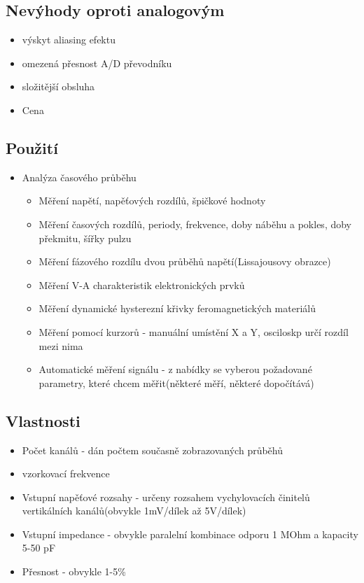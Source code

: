 \subsection*{Nevýhody oproti analogovým}
\begin{itemize}
    \item výskyt aliasing efektu
    \item omezená přesnost A/D převodníku
    \item složitější obsluha
    \item Cena 
\end{itemize}

\subsection*{Použití}
\begin{itemize}
    \item Analýza časového průběhu
    \begin{itemize}
        \item Měření napětí, napěťových rozdílů, špičkové hodnoty
        \item Měření časových rozdílů, periody, frekvence, doby náběhu a pokles, doby překmitu, šířky pulzu
        \item Měření fázového rozdílu dvou průběhů napětí(Lissajousovy obrazce)
        \item Měření V-A charakteristik elektronických prvků
        \item Měření dynamické hysterezní křivky feromagnetických materiálů
        \item Měření pomocí kurzorů - manuální umístění X a Y, osciloskp určí rozdíl mezi nima
        \item Automatické měření signálu - z nabídky se vyberou požadované parametry, které chcem měřit(některé měří, některé dopočítává)
    \end{itemize}
\end{itemize}

\subsection*{Vlastnosti}
\begin{itemize}
    \item Počet kanálů - dán počtem současně zobrazovaných průběhů
    \item vzorkovací frekvence 
    \item Vstupní napěťové rozsahy - určeny rozsahem vychylovacích činitelů vertikálních kanálů(obvykle 1mV/dílek až 5V/dílek)
    \item Vstupní impedance - obvykle paralelní kombinace odporu 1 MOhm a kapacity 5-50 pF
    \item Přesnost - obvykle 1-5\%
\end{itemize}

